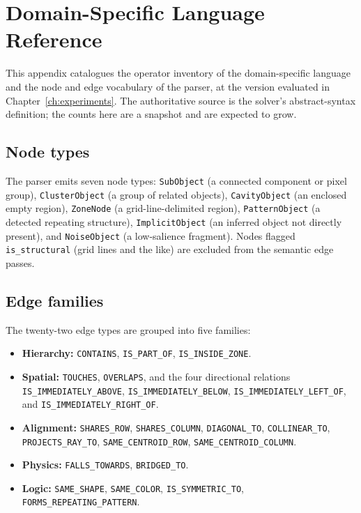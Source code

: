 \chapter{Domain-Specific Language Reference}
\label{app:dsl}

This appendix catalogues the operator inventory of the domain-specific language and the
node and edge vocabulary of the parser, at the version evaluated in
Chapter~\ref{ch:experiments}. The authoritative source is the solver's abstract-syntax
definition; the counts here are a snapshot and are expected to grow.

\section{Node types}
\label{app:nodes}

The parser emits seven node types: \texttt{SubObject} (a connected component or pixel
group), \texttt{ClusterObject} (a group of related objects), \texttt{CavityObject} (an
enclosed empty region), \texttt{ZoneNode} (a grid-line-delimited region),
\texttt{PatternObject} (a detected repeating structure), \texttt{ImplicitObject} (an
inferred object not directly present), and \texttt{NoiseObject} (a low-salience fragment).
Nodes flagged \texttt{is\_structural} (grid lines and the like) are excluded from
the semantic edge passes.

\section{Edge families}
\label{app:edges}

The twenty-two edge types are grouped into five families:

\begingroup\sloppy
\begin{itemize}
  \item \textbf{Hierarchy:} \texttt{CONTAINS}, \texttt{IS\_PART\_OF},
  \texttt{IS\_INSIDE\_ZONE}.
  \item \textbf{Spatial:} \texttt{TOUCHES}, \texttt{OVERLAPS}, and the four directional
  relations \texttt{IS\_IMMEDIATELY\_ABOVE}, \texttt{IS\_IMMEDIATELY\_BELOW},
  \texttt{IS\_IMMEDIATELY\_LEFT\_OF}, and \texttt{IS\_IMMEDIATELY\_RIGHT\_OF}.
  \item \textbf{Alignment:} \texttt{SHARES\_ROW}, \texttt{SHARES\_COLUMN},
  \texttt{DIAGONAL\_TO}, \texttt{COLLINEAR\_TO}, \texttt{PROJECTS\_RAY\_TO},
  \texttt{SAME\_CENTROID\_ROW}, \texttt{SAME\_CENTROID\_COLUMN}.
  \item \textbf{Physics:} \texttt{FALLS\_TOWARDS}, \texttt{BRIDGED\_TO}.
  \item \textbf{Logic:} \texttt{SAME\_SHAPE}, \texttt{SAME\_COLOR},
  \texttt{IS\_SYMMETRIC\_TO}, \texttt{FORMS\_REPEATING\_PATTERN}.
\end{itemize}
\endgroup


